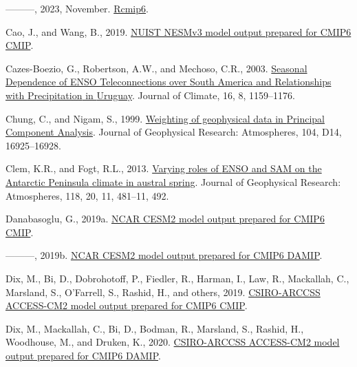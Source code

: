 \documentclass[12pt,oneside]{reedthesis}
\newlength{\cslhangindent}
\newenvironment{CSLReferences}[2] %
 {%
  \setlength{\parindent}{0pt}
  \ifodd #1 \everypar{\setlength{\hangindent}{\cslhangindent}}\ignorespaces\fi
  \ifnum #2 > 0
  \setlength{\parskip}{#2\baselineskip}
  \fi
 }%
 {}
\begin{document}
\begin{CSLReferences}{1}{0}
\leavevmode{}%
---------, 2023, November. \href{https://doi.org/10.5281/zenodo.10138834}{Rcmip6}.

\leavevmode{}%
Cao, J., and Wang, B., 2019. \href{https://doi.org/10.22033/ESGF/CMIP6.2021}{NUIST NESMv3 model output prepared for CMIP6 CMIP}.

\leavevmode{}%
Cazes-Boezio, G., Robertson, A.W., and Mechoso, C.R., 2003. \href{https://doi.org/10.1175/1520-0442(2003)16\%3C1159:SDOETO\%3E2.0.CO;2}{Seasonal {Dependence} of {ENSO Teleconnections} over {South America} and {Relationships} with {Precipitation} in {Uruguay}}. Journal of Climate, 16, 8, 1159--1176.

\leavevmode{}%
Chung, C., and Nigam, S., 1999. \href{https://doi.org/10.1029/1999JD900234}{Weighting of geophysical data in {Principal Component Analysis}}. Journal of Geophysical Research: Atmospheres, 104, D14, 16925--16928.

\leavevmode{}%
Clem, K.R., and Fogt, R.L., 2013. \href{https://doi.org/10.1002/jgrd.50860}{Varying roles of {ENSO} and {SAM} on the {Antarctic Peninsula} climate in austral spring}. Journal of Geophysical Research: Atmospheres, 118, 20, 11, 481--11, 492.

\leavevmode{}%
Danabasoglu, G., 2019a. \href{https://doi.org/10.22033/ESGF/CMIP6.2185}{NCAR CESM2 model output prepared for CMIP6 CMIP}.

\leavevmode{}%
---------, 2019b. \href{https://doi.org/10.22033/ESGF/CMIP6.2187}{NCAR CESM2 model output prepared for CMIP6 DAMIP}.

\leavevmode{}%
Dix, M., Bi, D., Dobrohotoff, P., Fiedler, R., Harman, I., Law, R., Mackallah, C., Marsland, S., O'Farrell, S., Rashid, H., and others, 2019. \href{https://doi.org/10.22033/ESGF/CMIP6.2281}{CSIRO-ARCCSS ACCESS-CM2 model output prepared for CMIP6 CMIP}.

\leavevmode{}%
Dix, M., Mackallah, C., Bi, D., Bodman, R., Marsland, S., Rashid, H., Woodhouse, M., and Druken, K., 2020. \href{https://doi.org/10.22033/ESGF/CMIP6.14361}{CSIRO-ARCCSS ACCESS-CM2 model output prepared for CMIP6 DAMIP}.


\end{CSLReferences}
\end{document}
